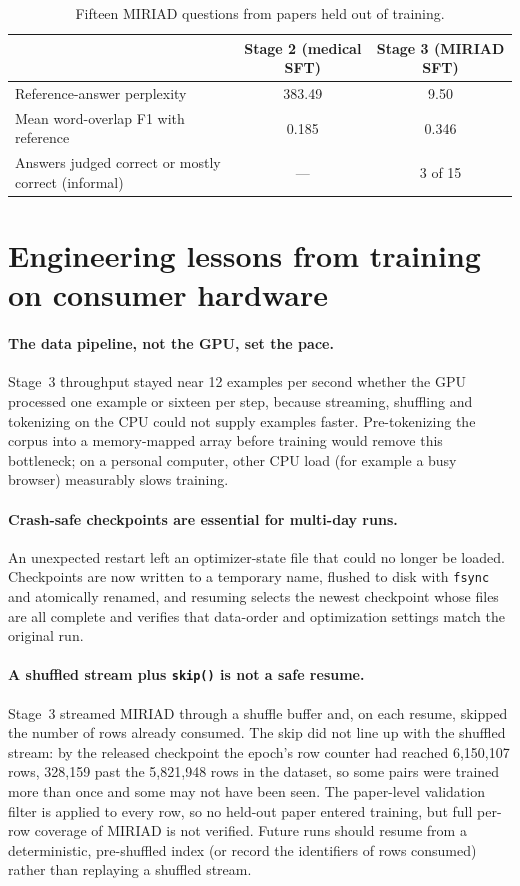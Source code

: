 \documentclass[11pt,a4paper]{article}
\begin{document}
\begin{table}[t]
\centering
\caption{Fifteen MIRIAD questions from papers held out of training.}
\label{tab:miriad}
\small
\begin{tabular}{@{}lcc@{}}
\toprule
 & Stage 2 (medical SFT) & Stage 3 (MIRIAD SFT) \\
\midrule
Reference-answer perplexity & 383.49 & 9.50 \\
Mean word-overlap F1 with reference & 0.185 & 0.346 \\
Answers judged correct or mostly correct (informal) & --- & 3 of 15 \\
\bottomrule
\end{tabular}
\end{table}

\section{Engineering lessons from training on consumer hardware}

\paragraph{The data pipeline, not the GPU, set the pace.} Stage~3 throughput stayed near 12 examples per second whether the GPU processed one example or sixteen per step, because streaming, shuffling and tokenizing on the CPU could not supply examples faster. Pre-tokenizing the corpus into a memory-mapped array before training would remove this bottleneck; on a personal computer, other CPU load (for example a busy browser) measurably slows training.

\paragraph{Crash-safe checkpoints are essential for multi-day runs.} An unexpected restart left an optimizer-state file that could no longer be loaded. Checkpoints are now written to a temporary name, flushed to disk with \texttt{fsync} and atomically renamed, and resuming selects the newest checkpoint whose files are all complete and verifies that data-order and optimization settings match the original run.

\paragraph{A shuffled stream plus \texttt{skip()} is not a safe resume.}\label{sec:coverage} Stage~3 streamed MIRIAD through a shuffle buffer and, on each resume, skipped the number of rows already consumed. The skip did not line up with the shuffled stream: by the released checkpoint the epoch's row counter had reached 6,150,107 rows, 328,159 past the 5,821,948 rows in the dataset, so some pairs were trained more than once and some may not have been seen. The paper-level validation filter is applied to every row, so no held-out paper entered training, but full per-row coverage of MIRIAD is not verified. Future runs should resume from a deterministic, pre-shuffled index (or record the identifiers of rows consumed) rather than replaying a shuffled stream.
\end{document}
